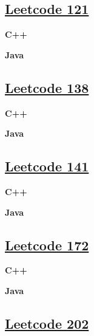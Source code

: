 \subsection{\href{https://leetcode-cn.com/}{Leetcode 121}}\label{app:codelist:leetcode:121}

\textbf{C++}\par


\textbf{Java}\par



\subsection{\href{https://leetcode-cn.com/}{Leetcode 138}}\label{app:codelist:leetcode:138}

\textbf{C++}\par


\textbf{Java}\par



\subsection{\href{https://leetcode-cn.com/}{Leetcode 141}}\label{app:codelist:leetcode:141}

\textbf{C++}\par


\textbf{Java}\par



\subsection{\href{https://leetcode-cn.com/}{Leetcode 172}}\label{app:codelist:leetcode:172}

\textbf{C++}\par


\textbf{Java}\par



\subsection{\href{https://leetcode-cn.com/}{Leetcode 202}}\label{app:codelist:leetcode:202}


